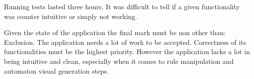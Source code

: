 \documentclass{article}
\begin{document}
Running tests lasted three hours. It was difficult to tell if a given functionality was counter intuitive or simply not working.

Given the state of the application the final mark must be non other than: 
{\color{red}Exclusion}. The application needs a lot of work to be accepted. Correctness of its functionalities must be the highest priority. However the application lacks a lot in being intuitive and clean, especially when it comes to rule manipulation and automaton visual generation steps.
\end{document}
